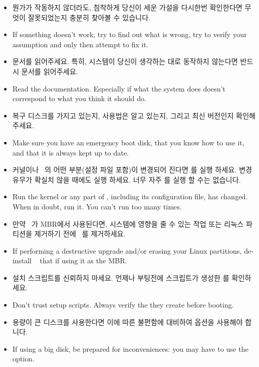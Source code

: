 \begin{itemize}
  \item {} 뭔가가 작동하지 않더라도,
  침착하게 당신이 세운 가설을 다시한번 확인한다면 무엇이 잘못되었는지 충분히 찾아볼 수 있습니다.
  \item {} If something doesn't work, try to find
    out what is wrong, try to verify your assumption and only then attempt
    to fix it.
  \item 문서를 읽어주세요. 특히, 시스템이 당신이 생각하는 대로 동작하지 않는다면 반드시 문서를 읽어주세요.    
  \item Read the documentation. Especially if what the system does doesn't
    correspond to what you think it should do.
  \item 복구 디스크를 가지고 있는지, 사용법은 알고 있는지, 그리고 최신 버전인지 확인해 주세요.
  \item Make sure you have an emergency boot disk, that you know how to
    use it, and that it is always kept up to date.
  \item {} 커널이나 \LILO\ 의 어떤 부분(설정 파일 포함)이 변경되어 진다면  를 실행 하세요. 변경 유무가 확실치 않을 때에도 실행 하세요. 너무 자주  를 실행 할 수는 없습니다.
  \item Run   the kernel or any part
    of \LILO, including its configuration file, has changed. When in doubt,
    run it. You can't run  too many times.
  \item 만약 \LILO\ 가 MBR에서 사용된다면, 시스템에 영향을 줄 수 있는 작업 또는 리눅스 파티션을 제거하기 전에 \LILO\ 를 제거하세요.
  \item If performing a destructive upgrade and/or erasing your Linux
    partitions, de-install \LILO\  that if using it as the
    MBR.
  \item 설치 스크립트를 신뢰하지 마세요. 언제나 부팅전에 스크립트가 생성한  를 확인하세요.
  \item Don't trust setup scripts. Always verify the 
    they create before booting.
  \item 용량이 큰 디스크를 사용한다면 이에 따른 불편함에 대비하여  옵션을 사용해야 합니다.
  \item If using a big disk, be prepared for inconveniences: you may have
    to use the  option.
\end{itemize}



